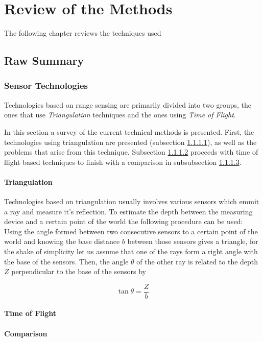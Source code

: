 \chapter{Review of the Methods}

  The following chapter reviews the techniques used 

  \section{Raw Summary}
    \subsection{Sensor Technologies}

    Technologies based on range sensing are primarily divided into two groups, the ones that use \textit{Triangulation} techniques and the ones using \textit{Time of Flight}.

    In this section a survey of the current technical methods is presented. First, the technologies using triangulation are presented (subsection \ref{ch_3:sect:summ:subsect:triang}), as well as the problems that arise from this technique. Subsection \ref{ch_3:sect:summ:subsect:tof} proceeds with time of flight based techniques to finish with a comparison in subsubsection \ref{ch_3:sect:summ:subsect:cmp}.

    \subsubsection{Triangulation} \label{ch_3:sect:summ:subsect:triang}

     Technologies based on triangulation usually involves various sensors which emmit a ray and measure it's reflection. To estimate the depth between the measuring device and a certain point of the world the following procedure can be used: Using the angle formed between two consecutive sensors to a certain point of the world and knowing the base distance $b$ between those sensors gives a triangle, for the shake of simplicity let us assume that one of the rays form a right angle with the base of the sensors. Then, the angle $\theta$ of the other ray is related to the depth $Z$ perpendicular to the base of the sensors by

    \begin{equation}
      \tan \theta = \frac{Z}{b}
    \end{equation}

    \subsubsection{Time of Flight} \label{ch_3:sect:summ:subsect:tof}

    \subsubsection{Comparison} \label{ch_3:sect:summ:subsect:cmp}

  \begin{comment}
   Chapter 31, part C, sect 31.2 Sensor Technologies
  \end{comment}

